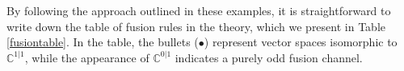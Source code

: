 \documentclass[12pt,a4paper]{article}
\newcommand{\tp}{\otimes}
\newcommand{\cc}{\mathbb{C}}
\newcommand{\fld}{\mathcal{F}} %
\newcommand{\dave}[1]{{\color{ao(english)}\footnotesize{(DA) #1}}}
\newcommand{\Pantssvtsvtsh}{\mathord{\vcenter{\hbox{\texttt{[image: Pantssvtsvtsh.pdf]}}}}}
\newcommand{\Pantssvtsvsh}{\mathord{\vcenter{\hbox{\texttt{[image: Pantssvtsvsh.pdf]}}}}}
\newcommand{\Pantssvsvtsh}{\mathord{\vcenter{\hbox{\texttt{[image: Pantssvsvtsh.pdf]}}}}}
\newcommand{\Pantssvsvsh}{\mathord{\vcenter{\hbox{\texttt{[image: Pantssvsvsh.pdf]}}}}}
\newcommand{\PantssvtsvtX}{\mathord{\vcenter{\hbox{\texttt{[image: PantssvtsvtX.pdf]}}}}}
\newcommand{\PantssvtsvX}{\mathord{\vcenter{\hbox{\texttt{[image: PantssvtsvX.pdf]}}}}}
\newcommand{\PantssvsvtX}{\mathord{\vcenter{\hbox{\texttt{[image: PantssvsvtX.pdf]}}}}}
\newcommand{\PantssvsvX}{\mathord{\vcenter{\hbox{\texttt{[image: PantssvsvX.pdf]}}}}}
\newcommand{\PantssvtXsvt}{\mathord{\vcenter{\hbox{\texttt{[image: PantssvtXsvt.pdf]}}}}}
\newcommand{\PantssvXsvt}{\mathord{\vcenter{\hbox{\texttt{[image: PantssvXsvt.pdf]}}}}}
\newcommand{\PantssvtXsv}{\mathord{\vcenter{\hbox{\texttt{[image: PantssvtXsv.pdf]}}}}}
\newcommand{\PantssvXsv}{\mathord{\vcenter{\hbox{\texttt{[image: PantssvXsv.pdf]}}}}}
\begin{document}

By following the approach outlined in these examples, it is straightforward to write down the table of fusion rules in the theory, which we present in Table \ref{fusiontable}. In the table, the bullets ($\bullet$) represent vector spaces isomorphic to $\cc^{1|1}$, while the appearance of $\cc^{0|1}$ indicates a purely odd fusion channel. 
\end{document}
